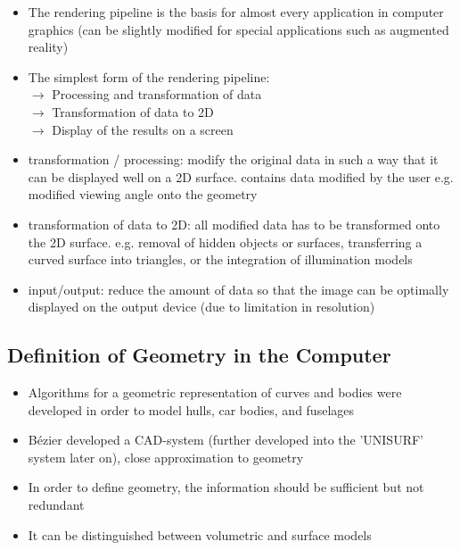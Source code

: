 \documentclass[12pt]{article}
\begin{document}
\begin{itemize}
	\item The rendering pipeline is the basis for almost every application in computer graphics
	(can be slightly modified for special applications such as augmented reality)
	\item The simplest form of the rendering pipeline: \\
	$\rightarrow$ Processing and transformation of data \\
	$\rightarrow$ Transformation of data to 2D \\
	$\rightarrow$ Display of the results on a screen
	\item transformation / processing: modify the original data in such a way that it can be displayed well on a 2D surface. contains data modified by the user e.g. modified viewing angle onto the geometry
	\item transformation of data to 2D: all modified data has to be transformed onto the 2D surface. e.g. removal of hidden objects or surfaces, transferring a curved surface into triangles, or the integration of illumination models
	\item input/output: reduce the amount of data so that the image can be optimally displayed on the output device (due to limitation in resolution)
\end{itemize}

\subsection{Definition of Geometry in the Computer}

\begin{itemize}
	\item Algorithms for a geometric representation of curves and bodies were developed in order to model hulls, car bodies, and fuselages
	\item B\'ezier developed a CAD-system (further developed into the 'UNISURF' system later on), close approximation to geometry
	\item In order to define geometry, the information should be sufficient but not redundant
	\item It can be distinguished between volumetric and surface models
\end{itemize}
\end{document}
